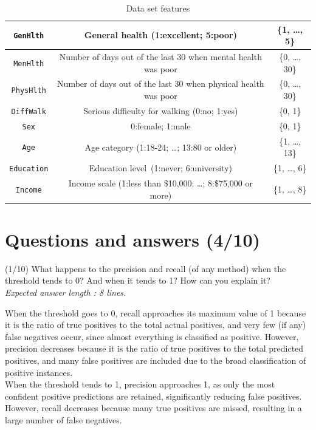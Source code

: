\documentclass [a4paper, 11pt] {article}
\begin{document}
\begin{table}[htpb]
\begin{tabular}{|c|c|c|}
\hline
\texttt{GenHlth} & General health (1:excellent; 5:poor) & \{1, \dots, 5\} \\ 
\hline
\texttt{MenHlth} & Number of days out of the last 30 when mental health was poor & \{0, \dots, 30\} \\ 
\hline
\texttt{PhysHlth} & Number of days out of the last 30 when physical health was poor & \{0, \dots, 30\} \\ 
\hline
\texttt{DiffWalk} & Serious difficulty for walking (0:no; 1:yes) & \{0, 1\} \\ 
\hline
\texttt{Sex} & 0:female; 1:male & \{0, 1\} \\ 
\hline
\texttt{Age} & Age category (1:18-24; \dots; 13:80 or older) & \{1, \dots, 13\} \\ 
\hline
\texttt{Education} & Education level~(1:never; 6:university) & \{1, \dots, 6\} \\ 
\hline
\texttt{Income} & Income scale (1:less than \$10,000; \dots; 8:\$75,000 or more) & \{1, \dots, 8\} \\
\hline
    \end{tabular}
    \caption{Data set features}
    \label{tab:featuresList}
\end{table}
\clearpage
\section{Questions and answers (4/10)}

\begin{question}{2.1}
(1/10) What happens to the precision and recall (of any method) when the threshold tends to
0? And when it tends to 1? How can you explain it?\\
\textit{Expected answer length : 8 lines.}
\end{question}
\begin{answer}\color{blue} 
When the threshold goes to 0, recall approaches its maximum value of 1 because it is the ratio of true positives to the total actual positives, and very few (if any) false negatives occur, since almost everything is classified as positive. However, precision decreases because it is the ratio of true positives to the total predicted positives, and many false positives are included due to the broad classification of positive instances.\\

When the threshold tends to 1, precision approaches 1, as only the most confident positive predictions are retained, significantly reducing false positives. However, recall decreases because many true positives are missed, resulting in a large number of false negatives.
\end{answer}
\end{document}
